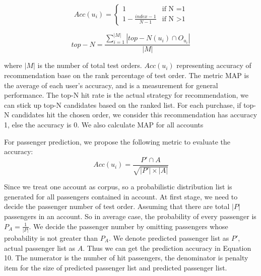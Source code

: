 \documentclass{sig-alternate-05-2015}
\begin{document}
\begin{equation}
Acc(u_i) =
\begin{cases}
1 & \mbox{if N =1}\\
1 - \frac{index-1}{N-1} & \mbox{if N >1}
\end{cases}
\end{equation}

\begin{equation}
top-N = \frac{\sum_{i=1}^{|M|}|top-N(u_i) \cap O_{u_i}|}{|M|}
\end{equation}

where $|M|$ is the number of total test orders. $Acc(u_i)$ representing accuracy of recommendation base on the rank percentage of test order. The metric MAP is the average of each user's accuracy, and is a measurement for general performance. The top-N hit rate is the actual strategy for recommendation, we can stick up top-N candidates based on the ranked list. For each purchase, if top-N candidates hit the chosen order, we consider this recommendation has accuracy 1, else the accuracy is 0. We also calculate MAP for all accounts \par
For passenger prediction, we propose the following metric to evaluate the accuracy:\\
\begin{equation}
Acc(u_i) = \frac{P' \cap A}{\sqrt{|P'| \times |A|}}
\end{equation}\par
Since we treat one account as corpus, so a probabilistic distribution list is generated for all passengers contained in account. At first stage, we need to decide the passenger number of test order. Assuming that there are total $|P|$ passengers in an account. So in average case, the probability of every passenger is $P_A = \frac{1}{|P|}$. We decide the passenger number by omitting passengers whose probability is not greater than $P_A$. We denote predicted passenger list as $P'$, actual passenger list as $A$. Thus we can get the prediction accuracy in Equation 10. The numerator is the number of hit passengers, the denominator is penalty item for the size of predicted passenger list and predicted passenger list.
\end{document}
